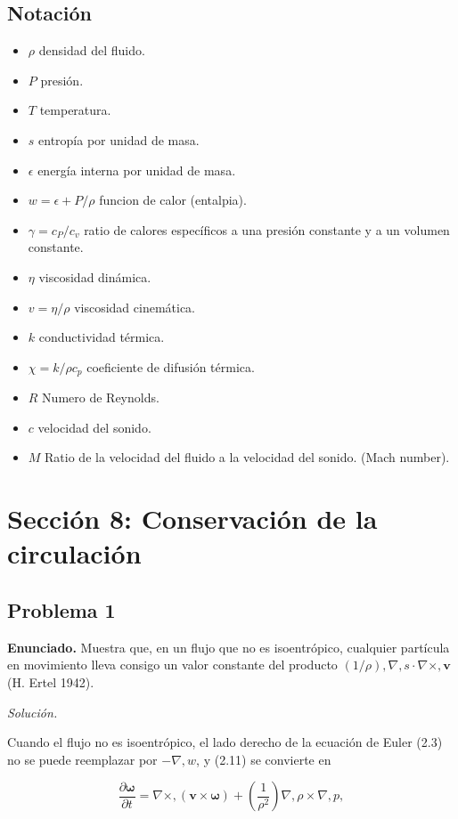\documentclass{article}
\begin{document}
\subsection*{Notación}
\begin{itemize}
    \item $\rho $ densidad del fluido.
    \item $P$ presión.
    \item $T$ temperatura.
    \item $s$ entropía por unidad de masa.
    \item $\epsilon$ energía interna por unidad de masa.
    \item $w = \epsilon + P/\rho$ funcion de calor (entalpia).
    \item $\gamma = c_{P}/c_{v}$ ratio de calores específicos a una presión constante y a un volumen constante.
    \item $\eta$ viscosidad dinámica.
    \item $v= \eta / \rho$ viscosidad cinemática.
    \item $k$ conductividad térmica.
    \item $\chi =k/\rho c_{p}$ coeficiente de difusión térmica.
    \item $R$ Numero de Reynolds.
    \item $c$ velocidad del sonido.
    \item $M$ Ratio de la velocidad del fluido a la velocidad del sonido. (Mach number).
\end{itemize}
\section*{Sección 8: Conservación de la circulación}
\subsection*{Problema 1}

\textbf{Enunciado.} Muestra que, en un flujo que no es isoentrópico, cualquier partícula en movimiento lleva consigo un valor constante del producto $(1/\rho) , \nabla , s \cdot \nabla \times , \mathbf{v}$ (H. Ertel 1942).

\textit{Solución.}

Cuando el flujo no es isoentrópico, el lado derecho de la ecuación de Euler (2.3) no se puede reemplazar por $-\nabla , w$, y (2.11) se convierte en

$$
\frac{\partial \boldsymbol{\omega}}{\partial t} = \nabla \times , (\mathbf{v} \times \boldsymbol{\omega}) + \left( \frac{1}{\rho^2} \right) \nabla , \rho \times \nabla , p,
$$
\end{document}
